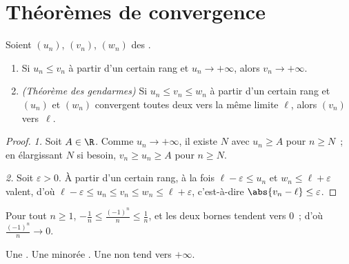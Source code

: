 \section{Théorèmes de convergence}

\begin{theorem}\label{thm:g12:seq:squeeze}
Soient $(u_n)$, $(v_n)$, $(w_n)$ des .
\begin{enumerate}
  \item Si $u_n \leq v_n$ à partir d'un certain rang et $u_n \to +\infty$,
        alors $v_n \to +\infty$.
  \item \emph{(Théorème des gendarmes)} Si
        $u_n \leq v_n \leq w_n$ à partir d'un certain rang et $(u_n)$ et
        $(w_n)$ convergent toutes deux vers la même limite $\ell$, alors
        $(v_n)$  vers~$\ell$.
\end{enumerate}
\end{theorem}

\begin{proof}
\emph{1.} Soit $A \in \R$. Comme $u_n \to +\infty$, il existe $N$ avec
$u_n \geq A$ pour $n \geq N$~; en élargissant $N$ si besoin,
$v_n \geq u_n \geq A$ pour $n \geq N$.

\emph{2.} Soit $\varepsilon > 0$. À partir d'un certain rang, à la fois
$\ell - \varepsilon \leq u_n$ et $w_n \leq \ell + \varepsilon$ valent,
d'où $\ell - \varepsilon \leq u_n \leq v_n \leq w_n \leq \ell + \varepsilon$,
c'est-à-dire $\abs{v_n - \ell} \leq \varepsilon$.
\end{proof}

\begin{example}
Pour tout $n \geq 1$, $-\frac{1}{n} \leq \frac{(-1)^n}{n} \leq \frac{1}{n}$,
et les deux bornes tendent vers $0$~; d'où $\frac{(-1)^n}{n} \to 0$.
\end{example}

\begin{theorem}\label{thm:g12:seq:monotone}
Une    . Une   minorée
. Une   non  tend vers $+\infty$.
\end{theorem}

